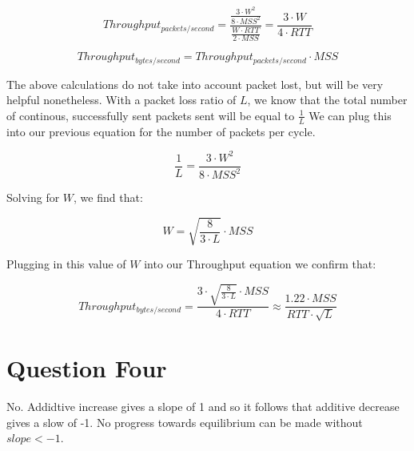 \documentclass[a4paper]{article}
\begin{document}
\[
Throughput_{packets/second} = \frac{\frac{3\cdot W^{2}}{8\cdot \mathit{MSS^{2}}}}{\frac{W\cdot \mathit{RTT}}{2\cdot \mathit{MSS}}} = \frac{3\cdot W}{4\cdot \mathit{RTT}}
\]

\[
Throughput_{bytes/second} = Throughput_{packets/second} \cdot \mathit{MSS}
\]

The above calculations do not take into account packet lost, but will be very helpful nonetheless. With a packet loss ratio of $L$, we know that the total number of continous, successfully sent packets sent will be equal to $\frac{1}{L}$ We can plug this into our previous equation for the number of packets per cycle.

\[
\frac{1}{L} = \frac{3\cdot W^{2}}{8\cdot \mathit{MSS^{2}}}
\]

Solving for $W$, we find that:

\[
W = \sqrt{\frac{8}{3\cdot L}}\cdot \mathit{MSS}
\]

Plugging in this value of $W$ into our Throughput equation we confirm that:

\[
Throughput_{bytes/second} = \frac{3\cdot \sqrt{\frac{8}{3\cdot L}}\cdot \mathit{MSS}}{4\cdot \mathit{RTT}} \approx \frac{1.22\cdot \mathit{MSS}}{\mathit{RTT}\cdot \sqrt{L}}
\]

\section{Question Four}
No. Addidtive increase gives a slope of 1 and so it follows that additive decrease gives a slow of -1. No progress towards equilibrium can be made without $slope < -1$.
\begin{center}

\end{center}


\end{document}
